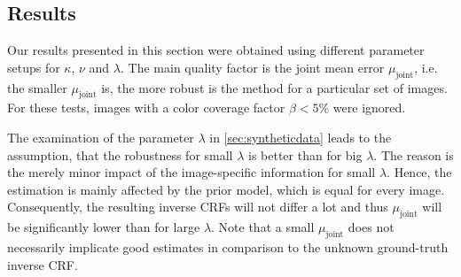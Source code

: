 \clearpage

\subsection{Results}
\label{subsec:stabilityResults}

Our results presented in this section were obtained using different parameter setups for $\kappa$, $\nu$ and $\lambda$. The main quality factor is the joint mean error $\mu_\text{joint}$, \hbox{i.e.} the smaller $\mu_\text{joint}$ is, the more robust is the method for a particular set of images. For these tests, images with a color coverage factor $\beta < 5\%$ were ignored. 

The examination of the parameter $\lambda$ in \autoref{sec:syntheticdata} leads to the assumption, that the robustness for small $\lambda$ is better than for big $\lambda$. The reason is the merely minor impact of the image-specific information for small $\lambda$. Hence, the estimation is mainly affected by the prior model, which is equal for every image. Consequently, the resulting inverse CRFs will not differ a lot and thus $\mu_\text{joint}$ will be significantly lower than for large $\lambda$. Note that a small $\mu_\text{joint}$ does not necessarily implicate good estimates in comparison to the unknown ground-truth inverse CRF.

